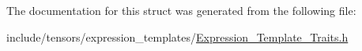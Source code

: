 The documentation for this struct was generated from the following file\+:\begin{DoxyCompactItemize}
\item 
include/tensors/expression\+\_\+templates/\hyperlink{Expression__Template__Traits_8h}{Expression\+\_\+\+Template\+\_\+\+Traits.\+h}\end{DoxyCompactItemize}
